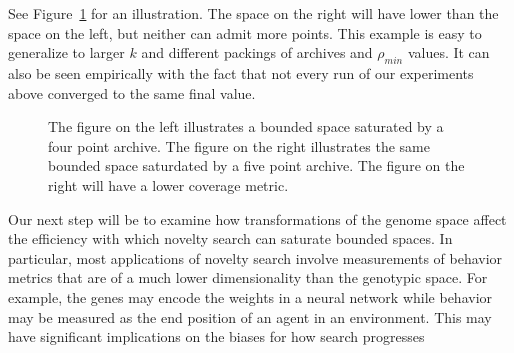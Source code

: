 \documentclass[twoside]{article}
\begin{document}
See Figure~\ref{fig:local:conv} for an illustration.  The space on the right will have lower  than the space on the left, but neither can admit more points.  This example is easy to generalize to larger $k$ and different packings of archives and $\rho_{min}$ values.  It can also be seen empirically with the fact that not every run of our experiments above converged to the same final  value.  
%
\begin{figure}[ht]
  \center{}
  
  \caption{\label{fig:local:conv} The figure on the left illustrates a bounded space saturated by a four point archive.  The figure on the right illustrates the same bounded space saturdated by a five point archive.  The figure on the right will have a lower coverage metric.}
\end{figure}

Our next step will be to examine how transformations of the genome space affect the efficiency with which novelty search can saturate bounded spaces.  In particular, most applications of novelty search involve measurements of behavior metrics that are of a much lower dimensionality than the genotypic space.  For example, the genes may encode the weights in a neural network while behavior may be measured as the end position of an agent in an environment.  This may have significant implications on the biases for how search progresses

\small



\end{document}
